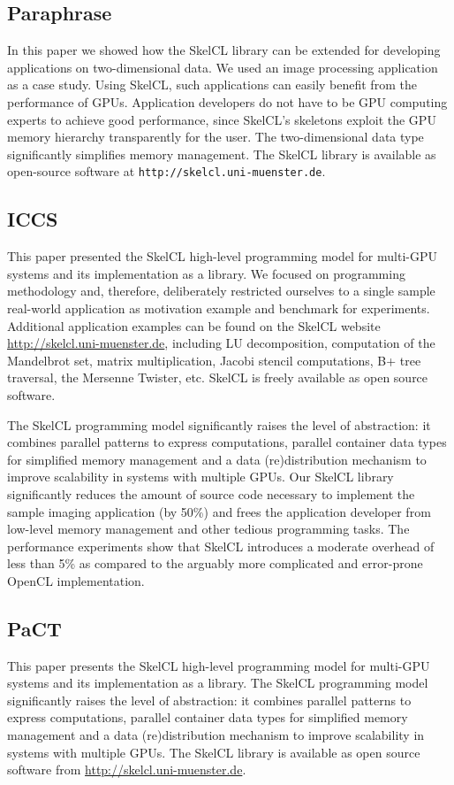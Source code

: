 \subsection{Paraphrase}
In this paper we showed how the SkelCL library can be extended for developing applications on two-dimensional data.
We used an image processing application as a case study.
Using SkelCL, such applications can easily benefit from the performance of GPUs.
Application developers do not have to be GPU computing experts to achieve good performance, since SkelCL's skeletons exploit the GPU memory hierarchy transparently for the user.
The two-dimensional data type significantly simplifies memory management.
The SkelCL library is available as open-source software at \texttt{http://skelcl.uni-muenster.de}.

\subsection{ICCS}
This paper presented the SkelCL high-level programming model for multi-GPU systems and its implementation as a library.
We focused on programming methodology and, therefore, deliberately restricted ourselves to a single sample real-world application as motivation example and benchmark for experiments.
Additional application examples can be found on the SkelCL website \url{http://skelcl.uni-muenster.de}, including LU decomposition, computation of the Mandelbrot set, matrix multiplication, Jacobi stencil computations, B+ tree traversal, the Mersenne Twister, etc. SkelCL is freely available as open source software.

The SkelCL programming model significantly raises the level of abstraction: it combines parallel patterns to express computations, parallel container data types for simplified memory management and a data (re)distribution mechanism to improve scalability in systems with multiple GPUs.
Our SkelCL library significantly reduces the amount of source code necessary to implement the sample imaging application (by 50\%) and frees the application developer from low-level memory management and other tedious programming tasks.
The performance experiments show that SkelCL introduces a moderate overhead of less than 5\% as compared to the arguably more complicated and error-prone OpenCL implementation.

\subsection{PaCT}
This paper presents the SkelCL high-level programming model for multi-GPU systems and its implementation as a library.  
The SkelCL programming model significantly raises the level of abstraction: it combines parallel patterns to express computations, parallel container data types for simplified memory management and a data (re)distribution mechanism to improve scalability in systems with multiple GPUs.
The SkelCL library is available as open source software from \url{http://skelcl.uni-muenster.de}.

